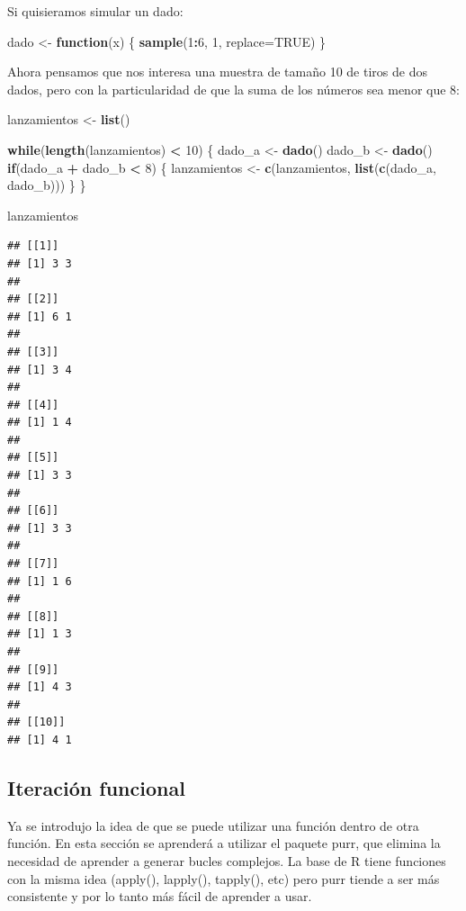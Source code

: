 \documentclass[]{book}
\newenvironment{Shaded}{\begin{snugshade}}{\end{snugshade}}
\newcommand{\KeywordTok}[1]{\textcolor[rgb]{0.13,0.29,0.53}{\textbf{#1}}}
\newcommand{\DataTypeTok}[1]{\textcolor[rgb]{0.13,0.29,0.53}{#1}}
\newcommand{\DecValTok}[1]{\textcolor[rgb]{0.00,0.00,0.81}{#1}}
\newcommand{\StringTok}[1]{\textcolor[rgb]{0.31,0.60,0.02}{#1}}
\newcommand{\OtherTok}[1]{\textcolor[rgb]{0.56,0.35,0.01}{#1}}
\newcommand{\ControlFlowTok}[1]{\textcolor[rgb]{0.13,0.29,0.53}{\textbf{#1}}}
\newcommand{\OperatorTok}[1]{\textcolor[rgb]{0.81,0.36,0.00}{\textbf{#1}}}
\newcommand{\NormalTok}[1]{#1}
\theoremstyle{definition}
\theoremstyle{definition}
\theoremstyle{definition}
\theoremstyle{remark}
\begin{document}
Si quisieramos simular un dado:

\begin{Shaded}
\begin{Highlighting}[]
\NormalTok{dado <-}\StringTok{ }\ControlFlowTok{function}\NormalTok{(x) \{}
  \KeywordTok{sample}\NormalTok{(}\DecValTok{1}\OperatorTok{:}\DecValTok{6}\NormalTok{, }\DecValTok{1}\NormalTok{, }\DataTypeTok{replace=}\OtherTok{TRUE}\NormalTok{)}
\NormalTok{\}}
\end{Highlighting}
\end{Shaded}

Ahora pensamos que nos interesa una muestra de tamaño 10 de tiros de dos
dados, pero con la particularidad de que la suma de los números sea
menor que 8:

\begin{Shaded}
\begin{Highlighting}[]
\NormalTok{lanzamientos <-}\StringTok{ }\KeywordTok{list}\NormalTok{()}

\ControlFlowTok{while}\NormalTok{(}\KeywordTok{length}\NormalTok{(lanzamientos) }\OperatorTok{<}\StringTok{ }\DecValTok{10}\NormalTok{) \{}
\NormalTok{  dado_a <-}\StringTok{ }\KeywordTok{dado}\NormalTok{()}
\NormalTok{  dado_b <-}\StringTok{ }\KeywordTok{dado}\NormalTok{()}
  \ControlFlowTok{if}\NormalTok{(dado_a }\OperatorTok{+}\StringTok{ }\NormalTok{dado_b }\OperatorTok{<}\StringTok{ }\DecValTok{8}\NormalTok{) \{}
\NormalTok{    lanzamientos <-}\StringTok{ }\KeywordTok{c}\NormalTok{(lanzamientos, }\KeywordTok{list}\NormalTok{(}\KeywordTok{c}\NormalTok{(dado_a, dado_b)))}
\NormalTok{  \}}
\NormalTok{\}}


\NormalTok{lanzamientos}
\end{Highlighting}
\end{Shaded}

\begin{verbatim}
## [[1]]
## [1] 3 3
## 
## [[2]]
## [1] 6 1
## 
## [[3]]
## [1] 3 4
## 
## [[4]]
## [1] 1 4
## 
## [[5]]
## [1] 3 3
## 
## [[6]]
## [1] 3 3
## 
## [[7]]
## [1] 1 6
## 
## [[8]]
## [1] 1 3
## 
## [[9]]
## [1] 4 3
## 
## [[10]]
## [1] 4 1
\end{verbatim}

\subsection{Iteración funcional}\label{iteracion-funcional}

Ya se introdujo la idea de que se puede utilizar una función dentro de
otra función. En esta sección se aprenderá a utilizar el paquete purr,
que elimina la necesidad de aprender a generar bucles complejos. La base
de R tiene funciones con la misma idea (apply(), lapply(), tapply(),
etc) pero purr tiende a ser más consistente y por lo tanto más fácil de
aprender a usar.
\end{document}
